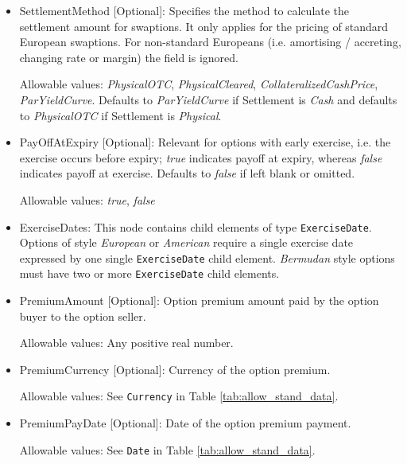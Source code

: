 \begin{itemize}
\item SettlementMethod [Optional]: Specifies the method to calculate the settlement amount for swaptions. It only applies for the pricing of standard European swaptions. For non-standard Europeans (i.e. amortising / accreting, changing rate or margin) the field is ignored.

  Allowable values: \emph{PhysicalOTC}, \emph{PhysicalCleared}, \emph{CollateralizedCashPrice},\\ \emph{ParYieldCurve}. Defaults to \emph{ParYieldCurve} if Settlement is \emph{Cash} and defaults to \emph{PhysicalOTC} if Settlement is \emph{Physical}.

\item PayOffAtExpiry [Optional]: Relevant for options with early
  exercise, i.e. the exercise occurs before expiry; \emph{true}
  indicates payoff at expiry, whereas \emph{false}  indicates payoff
  at exercise. Defaults to \emph{false}  if left blank or omitted. 

Allowable values: \emph{true}, \emph{false}

\item ExerciseDates: This node contains child elements of type
  \lstinline!ExerciseDate!.  Options of style \emph{European} or
  \emph{American} require a single exercise date expressed by one
  single \lstinline!ExerciseDate! child element.  \emph{Bermudan}
  style options must have two or more \lstinline!ExerciseDate! child
  elements.

\item PremiumAmount [Optional]: Option premium amount paid by the option buyer to the option seller.

Allowable values:  Any positive real number.

\item PremiumCurrency [Optional]: Currency of the option premium.

Allowable values:  See \lstinline!Currency! in Table \ref{tab:allow_stand_data}.

\item PremiumPayDate [Optional]: Date of the option premium payment.

Allowable values:  See \lstinline!Date! in Table \ref{tab:allow_stand_data}.

\end{itemize}



